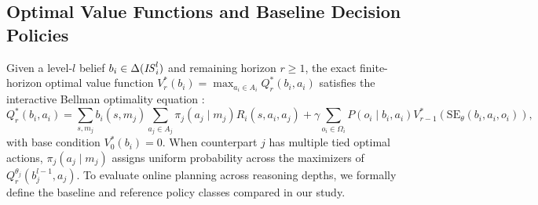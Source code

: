 \subsection{Optimal Value Functions and Baseline Decision Policies}

Given a level-$l$ belief $b_i \in \Delta(\mathit{IS}_i^l)$ and remaining horizon $r \ge 1$, the exact finite-horizon optimal value function $V_r^*(b_i) = \max_{a_i \in A_i} Q_r^*(b_i, a_i)$ satisfies the interactive Bellman optimality equation \citep{gmytrasiewicz2005framework}:
\begin{equation}
  Q_r^*(b_i, a_i) = \sum_{s, m_j} b_i(s, m_j) \sum_{a_j \in A_j} \pi_j(a_j \mid m_j) R_i(s, a_i, a_j) + \gamma \sum_{o_i \in \Omega_i} P(o_i \mid b_i, a_i) V_{r-1}^*\!\left(\mathrm{SE}_\theta(b_i, a_i, o_i)\right),
  \label{eq:bellman}
\end{equation}
with base condition $V_0^*(b_i) = 0$. When counterpart $j$ has multiple tied optimal actions, $\pi_j(a_j \mid m_j)$ assigns uniform probability across the maximizers of $Q_{r}^{\theta_j}(b_j^{l-1}, a_j)$. To evaluate online planning across reasoning depths, we formally define the baseline and reference policy classes compared in our study.

